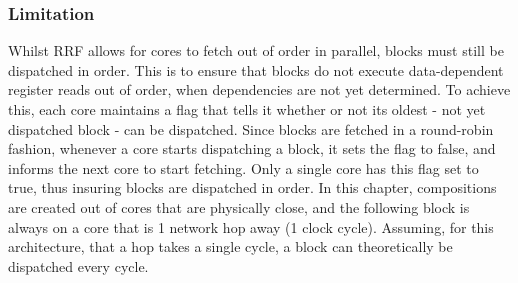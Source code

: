 
\subsubsection{Limitation}

Whilst RRF allows for cores to fetch out of order in parallel, blocks must still be dispatched in order.
This is to ensure that blocks do not execute data-dependent register reads out of order, when dependencies are not yet determined.
To achieve this, each core maintains a flag that tells it whether or not its oldest - not yet dispatched block - can be dispatched.
Since blocks are fetched in a round-robin fashion, whenever a core starts dispatching a block, it sets the flag to false, and informs the next core to start fetching.
Only a single core has this flag set to true, thus insuring blocks are dispatched in order.
In this chapter, compositions are created out of cores that are physically close, and the following block is always on a core that is 1 network hop away (1 clock cycle).
Assuming, for this architecture, that a hop takes a single cycle, a block can theoretically be dispatched every cycle.




